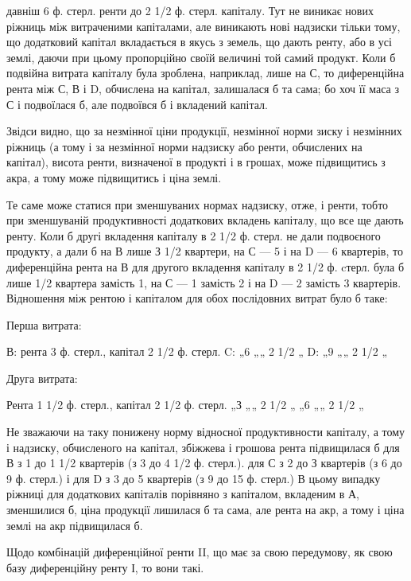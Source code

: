 \parcont{}  %
давніш 6 ф. стерл. ренти до 2 1/2 ф. стерл. капіталу. Тут не виникає нових
ріжниць між витраченими капіталами, але виникають нові надзиски тільки
тому, що додатковий капітал вкладається в якусь з земель, що дають ренту,
або в усі землі, даючи при цьому пропорційно своїй величині той самий
продукт. Коли б подвійна витрата капіталу була зроблена, наприклад, лише
на С, то диференційна рента між С, В і D, обчислена на капітал, залишалася б
та сама; бо хоч її маса з С і подвоїлася б, але подвоївся б і вкладений
капітал.

Звідси видно, що за незмінної ціни продукції, незмінної норми зиску і
незмінних ріжниць (а тому і за незмінної норми надзиску або ренти, обчислених
на капітал), висота ренти, визначеної в продукті і в грошах, може підвищитись
з акра, а тому може підвищитись і ціна землі.

Те саме може статися при зменшуваних нормах надзиску, отже, і ренти,
тобто при зменшуваній продуктивності додаткових вкладень капіталу, що все
ще дають ренту. Коли б другі вкладення капіталу в 2 1/2 ф. стерл. не дали
подвоєного продукту, а дали б на В лише З 1/2 квартери, на С — 5 і на D —
6 квартерів, то диференційна рента на В для другого вкладення капіталу в 2 1/2 ф.
cтерл. була б лише 1/2 квартера замість 1, на С — 1 замість 2 і на D — 2 замість
3 квартерів. Відношення між рентою і капіталом для обох послідовних
витрат було б таке:

Перша витрата:

В: рента 3 ф. стерл., капітал 2 1/2 ф. стерл.
C: „6 „„ 2 1/2 „
D: „9 „„ 2 1/2 „

Друга витрата:

Рента 1 1/2 ф. стерл., капітал 2 1/2 ф. стерл.
„З „„ 2 1/2 „
„6 „„ 2 1/2 „

Не зважаючи на таку понижену норму відносної продуктивности капіталу,
а тому і надзиску, обчисленого на капітал, збіжжева і грошова рента підвищилася
б для В з 1 до 1 1/2 квартерів (з 3 до 4 1/2 ф. стерл.). для С з 2 до
З квартерів (з 6 до 9 ф. стерл.) і для D з 3 до 5 квартерів (з 9 до 15 ф. стерл.)
В цьому випадку ріжниці для додаткових капіталів порівняно з капіталом,
вкладеним в А, зменшилися б, ціна продукції лишилася б та сама, але рента
на акр, а тому і ціна землі на акр підвищилася б.

Щодо комбінацій диференційної ренти II, що має за свою передумову, як
свою базу диференційну ренту І, то вони такі.

